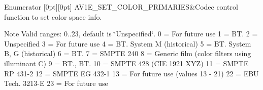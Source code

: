 \begin{DoxyEnumFields}{Enumerator}
[0pt][0pt]{}\mbox{\label{group__aom__encoder_ggae78dde67a6d78f332e9bdba0dde42db5af64e990728fe37287bac0874d77b22db}} 
A\+V1\+E\+\_\+\+S\+E\+T\+\_\+\+C\+O\+L\+O\+R\+\_\+\+P\+R\+I\+M\+A\+R\+I\+ES&Codec control function to set color space info. \begin{DoxyNote}{Note}
Valid ranges\+: 0..23, default is \char`\"{}\+Unspecified\char`\"{}. 0 = For future use 1 = B\+T. 2 = Unspecified 3 = For future use 4 = B\+T. System M (historical) 5 = B\+T. System B, G (historical) 6 = B\+T. 7 = S\+M\+P\+TE 240 8 = Generic film (color filters using illuminant C) 9 = B\+T., B\+T. 10 = S\+M\+P\+TE 428 (C\+IE 1921 X\+YZ) 11 = S\+M\+P\+TE RP 431-\/2 12 = S\+M\+P\+TE EG 432-\/1 13 = For future use (values 13 -\/ 21) 22 = E\+BU Tech. 3213-\/E 23 = For future use 
\end{DoxyNote}
\\
\hline


\end{DoxyEnumFields}
